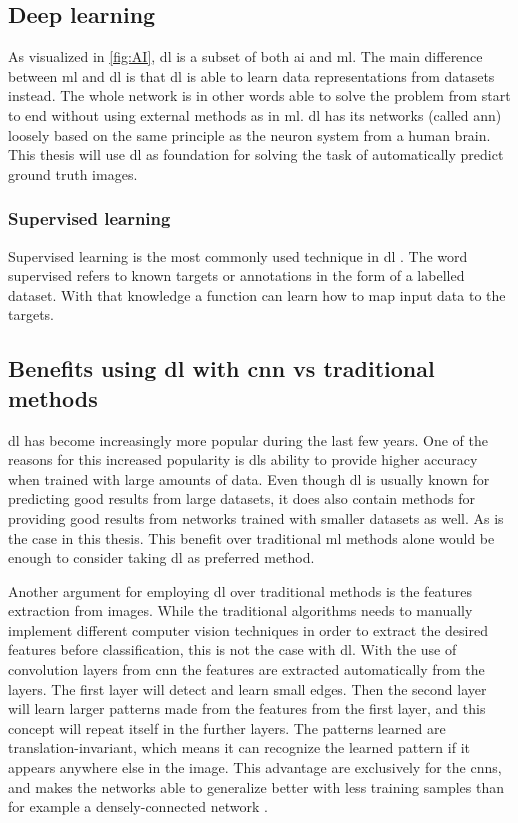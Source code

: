 \documentclass[USenglish]{ifimaster}  %
\begin{document}
\subsection{Deep learning}
As visualized in \cref{fig:AI}, \ac{dl} is a subset of both \ac{ai} and \ac{ml}. The main difference between \ac{ml} and \ac{dl} is that \ac{dl} is able to learn data representations from datasets instead. The whole network is in other words able to solve the problem from start to end without using external methods as in \ac{ml}. \ac{dl} has its networks (called \ac{ann}) loosely based on the same principle as the neuron system from a human brain. This thesis will use \ac{dl} as foundation for solving the task of automatically predict ground truth images. 

\subsubsection{Supervised learning}
Supervised learning is the most commonly used technique in \ac{dl} \cite{Francois_Deep_learning_with_python}. The word supervised refers to known targets or annotations in the form of a labelled dataset. With that knowledge a function can learn how to map input data to the targets.

\subsection{Benefits using \ac{dl} with \ac{cnn} vs traditional methods}
\ac{dl} has become increasingly more popular during the last few years. One of the reasons for this increased popularity is \acp{dl} ability to provide higher accuracy when trained with large amounts of data. Even though \ac{dl} is usually known for predicting good results from large datasets, it does also contain methods for providing good results from networks trained with smaller datasets as well. As is the case in this thesis. This benefit over traditional \ac{ml} methods alone would be enough to consider taking \ac{dl} as preferred method.

Another argument for employing \ac{dl} over traditional methods is the features extraction from images. While the traditional algorithms needs to manually implement different computer vision techniques in order to extract the desired features before classification, this is not the case with \ac{dl}. With the use of convolution layers from \ac{cnn} the features are extracted automatically from the layers.
The first layer will detect and learn small edges. Then the second layer will learn larger patterns made from the features from the first layer, and this concept will repeat itself in the further layers. The patterns learned are translation-invariant, which means it can recognize the learned pattern if it appears anywhere else in the image. This advantage are exclusively for the \acp{cnn}, and makes the networks able to generalize better with less training samples than for example a densely-connected network \cite{Francois_Deep_learning_with_python}.
\end{document}
